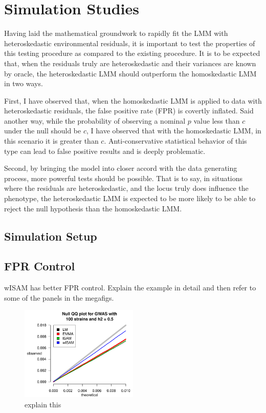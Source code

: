 \section{Simulation Studies}

Having laid the mathematical groundwork to rapidly fit the LMM with heteroskedastic environmental residuals, it is important to test the properties of this testing procedure as compared to the existing procedure.
It is to be expected that, when the residuals truly are heteroskedastic and their variances are known by oracle, the heteroskedastic LMM should outperform the homoskedastic LMM in two ways.

First, I have observed that, when the homoskedastic LMM is applied to data with heteroskedastic residuals, the false positive rate (FPR) is covertly inflated.
Said another way, while the probability of observing a nominal $p$ value less than $c$ under the null should be $c$, I have observed that with the homoskedastic LMM, in this scenario it is greater than $c$.
Anti-conservative statistical behavior of this type can lead to false positive results and is deeply problematic.

Second, by bringing the model into closer accord with the data generating process, more powerful tests should be possible.
That is to say, in situations where the residuals are heteroskedastic, and the locus truly does influence the phenotype, the heteroskedastic LMM is expected to be more likely to be able to reject the null hypothesis than the homoskedastic LMM.

\subsection{Simulation Setup}



\subsection{FPR Control}

wISAM has better FPR control.  Explain the example in detail and then refer to some of the panels in the megafigs.

\begin{figure}
  \centering
  \includegraphics[width = 0.5\textwidth]{images/exampleQQ.pdf}
  \caption{explain this}
  \label{fig:exampleQQ}
\end{figure}


